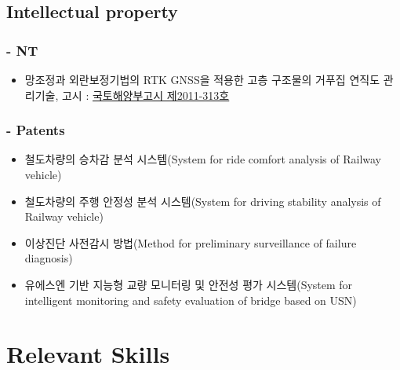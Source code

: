 \subsection*{Intellectual property}

\subsubsection*{ - NT}
\begin{itemize}
\item 망조정과 외란보정기법의 RTK GNSS을 적용한 고층 구조물의 거푸집 연직도 관리기술, 고시 : \href{http://www.kaia.re.kr/portal/newtec/view.do?searchCnd=1\&searchWrd=\&menuNo=200075\&frApntYear=\&toApntYear=\&pageUnit=10\&frApntNo=\&toApntNo=\&cate1=\&cate2=\&cate3=\&tecCat1=\&tecCat2=\&tecCat3=\&newtecCat1=\&newtecCat2=\&newtecCat3=\&dvlprNm=\%ED\%95\%9C\%EA\%B5\%AD\%EC\%9C\%A0\%EC\%A7\%80\%EA\%B4\%80\%EB\%A6\%AC\&ordDvs=\&pageIndex=1\&apntNo=625\&frMenu=list}{국토해양부고시
  제2011-313호} 
\end{itemize}

\subsubsection{ - Patents}
\begin{itemize}
\item 철도차량의 승차감 분석 시스템(System for ride comfort analysis of Railway vehicle)
\item 철도차량의 주행 안정성 분석 시스템(System for driving stability analysis of Railway vehicle)
\item 이상진단 사전감시 방법(Method for preliminary surveillance of failure diagnosis)
\item 유에스엔 기반 지능형 교량 모니터링 및 안전성 평가 시스템(System for intelligent monitoring and safety evaluation of bridge based on USN)
\end{itemize}

\section*{Relevant Skills}
